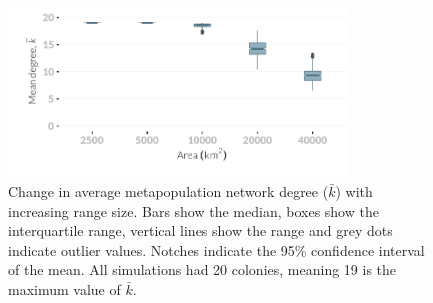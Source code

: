 \begin{knitrout}\footnotesize
{}\color{fgcolor}\begin{figure}[t]

{\centering \includegraphics[width=0.8\textwidth]{figure/plotK-1} 

}

\caption[Change in average network degree with increasing range size]{
Change in average metapopulation network degree ($\bar{k}$) with increasing range size. 
Bars show the median, boxes show the interquartile range, vertical lines show the range and grey dots indicate outlier values.
Notches indicate the 95\% confidence interval of the mean.
All simulations had 20 colonies, meaning 19 is the maximum value of $\bar{k}$.
}\label{fig:plotK}
\end{figure}


\end{knitrout}
















